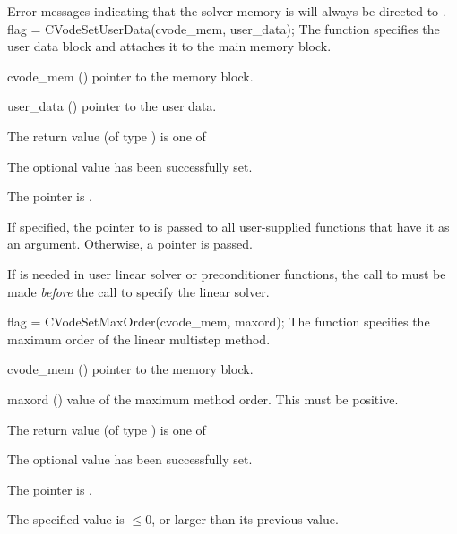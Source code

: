 {
  Error messages indicating that the {\cvodes} solver memory is  will 
  always be directed to .
}
{
  flag = CVodeSetUserData(cvode\_mem, user\_data);
}
{
  The function  specifies the user data block 
  and attaches it to the main {\cvodes} memory block.
}
{
  \begin{args}
  \item[cvode\_mem] ()
    pointer to the {\cvodes} memory block.
  \item[user\_data] ()
    pointer to the user data.
  \end{args}
}
{
  The return value  (of type ) is one of
  \begin{args}
  \item[\Id{CV\_SUCCESS}] 
    The optional value has been successfully set.
  \item[\Id{CV\_MEM\_NULL}]
    The  pointer is .
  \end{args}
}
{
  If specified, the pointer to  is passed to all user-supplied 
  functions that have it as an argument. Otherwise, a  pointer is passed.

  {\warn}If  is needed in user linear solver or preconditioner
  functions, the call to  must be made {\it before} the
  call to specify the linear solver.
}
{
flag = CVodeSetMaxOrder(cvode\_mem, maxord);
}
{
  The function  specifies the maximum order of the 
  linear multistep method.
}
{
  \begin{args}
  \item[cvode\_mem] ()
    pointer to the {\cvodes} memory block.
  \item[maxord] ()
    value of the maximum method order.  This must be positive.
  \end{args}
}
{
  The return value  (of type ) is one of
  \begin{args}
  \item[\Id{CV\_SUCCESS}] 
    The optional value has been successfully set.
  \item[\Id{CV\_MEM\_NULL}]
    The  pointer is .
  \item[\Id{CV\_ILL\_INPUT}]
    The specified value  is $\leq 0$, or larger than 
    its previous value.
  \end{args}
}
